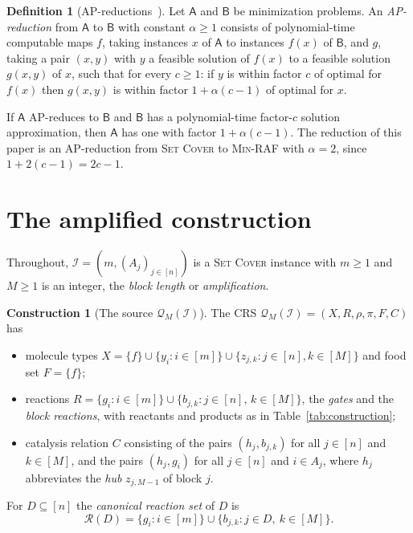 \documentclass[11pt,a4paper]{article}
\theoremstyle{plain}
\theoremstyle{definition}
\newtheorem{definition}[theorem]{Definition}
\newtheorem{construction}[theorem]{Construction}
\theoremstyle{remark}
\newcommand{\cQ}{\mathcal{Q}}
\newcommand{\cR}{\mathcal{R}}
\newcommand{\cI}{\mathcal{I}}
\newcommand{\SetCover}{\textup{\textsc{Set Cover}}}
\newcommand{\MinRAF}{\textup{\textsc{Min-RAF}}}
\begin{document}
\begin{definition}[AP-reductions~\cite{crescenzi1997short,ausiello1999complexity}]\label{def:ap}
Let $\mathsf{A}$ and $\mathsf{B}$ be minimization problems. An \emph{AP-reduction} from $\mathsf{A}$ to $\mathsf{B}$ with constant $\alpha\ge 1$ consists of polynomial-time computable maps $f$, taking instances $x$ of $\mathsf{A}$ to instances $f(x)$ of $\mathsf{B}$, and $g$, taking a pair $(x,y)$ with $y$ a feasible solution of $f(x)$ to a feasible solution $g(x,y)$ of $x$, such that for every $c\ge 1$: if $y$ is within factor $c$ of optimal for $f(x)$ then $g(x,y)$ is within factor $1+\alpha(c-1)$ of optimal for $x$.
\end{definition}

If $\mathsf{A}$ AP-reduces to $\mathsf{B}$ and $\mathsf{B}$ has a polynomial-time factor-$c$ solution approximation, then $\mathsf{A}$ has one with factor $1+\alpha(c-1)$. The reduction of this paper is an AP-reduction from \SetCover{} to \MinRAF{} with $\alpha=2$, since $1+2(c-1)=2c-1$.

\section{The amplified construction}\label{sec:construction}

Throughout, $\cI=(m,(A_j)_{j\in[n]})$ is a \SetCover{} instance with $m\ge 1$ and $M\ge 1$ is an integer, the \emph{block length} or \emph{amplification}.

\begin{construction}[The source $\cQ_M(\cI)$]\label{con:source}
The CRS $\cQ_M(\cI)=(X,R,\rho,\pi,F,C)$ has
\begin{itemize}
\item molecule types $X=\{f\}\cup\{y_i:i\in[m]\}\cup\{z_{j,k}:j\in[n],k\in[M]\}$ and food set $F=\{f\}$;
\item reactions $R=\{g_i:i\in[m]\}\cup\{b_{j,k}:j\in[n],\,k\in[M]\}$, the \emph{gates} and the \emph{block reactions}, with reactants and products as in Table~\ref{tab:construction};
\item catalysis relation $C$ consisting of the pairs $(h_j,b_{j,k})$ for all $j\in[n]$ and $k\in[M]$, and the pairs $(h_j,g_i)$ for all $j\in[n]$ and $i\in A_j$, where $h_j$ abbreviates the \emph{hub} $z_{j,M-1}$ of block $j$.
\end{itemize}
For $D\subseteq[n]$ the \emph{canonical reaction set} of $D$ is
\[
\cR(D)=\{g_i:i\in[m]\}\cup\{b_{j,k}:j\in D,\ k\in[M]\}.
\]
\end{construction}
\end{document}
